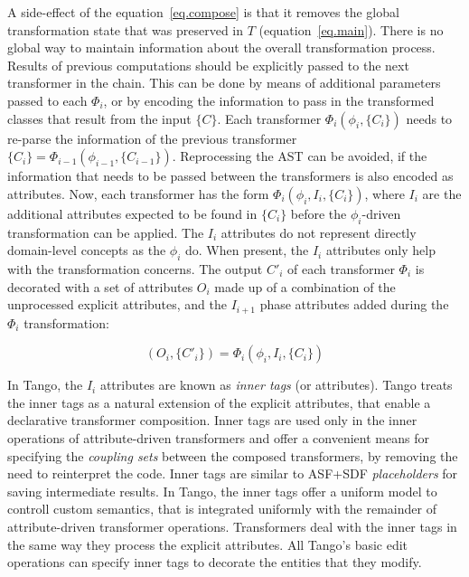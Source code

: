 A side-effect of the equation~\ref{eq.compose} is that it removes the global transformation state that was preserved in $T$ (equation~\ref{eq.main}). There is no global way to maintain information about the overall transformation process. Results of previous computations should be explicitly passed to the next transformer in the chain. This can be done by means of additional parameters passed to each $\Phi_i$, or by encoding the information to pass in the transformed classes that result from the input $\{C\}$. Each transformer $\Phi_i(\phi_i, \{C_i\})$ needs to re-parse the information of the previous transformer $\{C_i\} = \Phi_{i - 1}(\phi_{i - 1}, \{C_{i - 1}\})$. Reprocessing the AST can be avoided, if the information that needs to be passed between the transformers is also encoded as attributes. Now, each transformer has the form $\Phi_i(\phi_i, I_i, \{C_i\})$, where $I_i$ are the additional attributes expected to be found in $\{C_i\}$ before the $\phi_i$-driven transformation can be applied. The $I_i$ attributes do not represent directly domain-level concepts as the $\phi_i$ do. When present, the $I_i$ attributes only help with the transformation concerns. The output $C'_i$ of each transformer $\Phi_i$ is decorated with a set of attributes $O_i$ made up of a combination of the unprocessed explicit attributes, and the $I_{i+1}$ phase attributes added during the $\Phi_i$ transformation:

\begin{equation}
(O_i, \{C'_i\}) = \Phi_i(\phi_i, I_i, \{C_i\})
\label{eq.trans}
\end{equation}

In Tango, the $I_i$ attributes are known as \textit{inner tags} (or attributes). Tango treats the inner tags as a natural extension of the explicit attributes, that enable a declarative transformer composition. Inner tags are used only in the inner operations of attribute-driven transformers and offer a convenient means for specifying the \textit{coupling sets} between the composed transformers, by removing the need to reinterpret the code. Inner tags are similar to ASF+SDF \cite{asfsdf.02} \textit{placeholders} for saving intermediate results. In Tango, the inner tags offer a uniform model to controll custom semantics, that is integrated uniformly with the remainder of attribute-driven transformer operations. Transformers deal with the inner tags in the same way they process the explicit attributes. All Tango's basic edit operations can specify inner tags to decorate the entities that they modify. 

